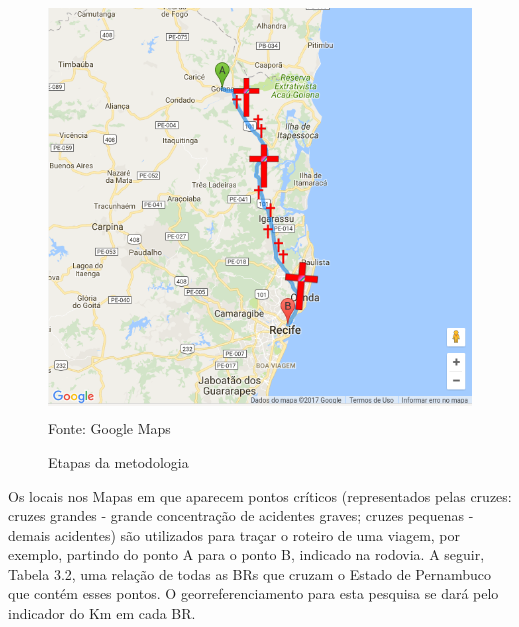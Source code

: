 \begin{figure}[ht]
	\centering
	\caption{Etapas da metodologia}
	\includegraphics[width=150mm, height=110mm]{Figuras/Metodologia/georreferenciamento.png}\\
	\tiny Fonte: Google Maps
\end{figure}


\pagebreak

Os locais nos Mapas em que aparecem pontos críticos (representados pelas cruzes: cruzes grandes - grande concentração de acidentes graves; cruzes pequenas - demais acidentes) são utilizados para traçar o roteiro de uma viagem, por exemplo, partindo do ponto A para o ponto B, indicado na rodovia. 
A seguir, Tabela 3.2, uma relação de todas as BRs que cruzam o Estado de Pernambuco que contém esses pontos. 
O georreferenciamento para esta pesquisa se dará pelo indicador do Km em cada BR.

